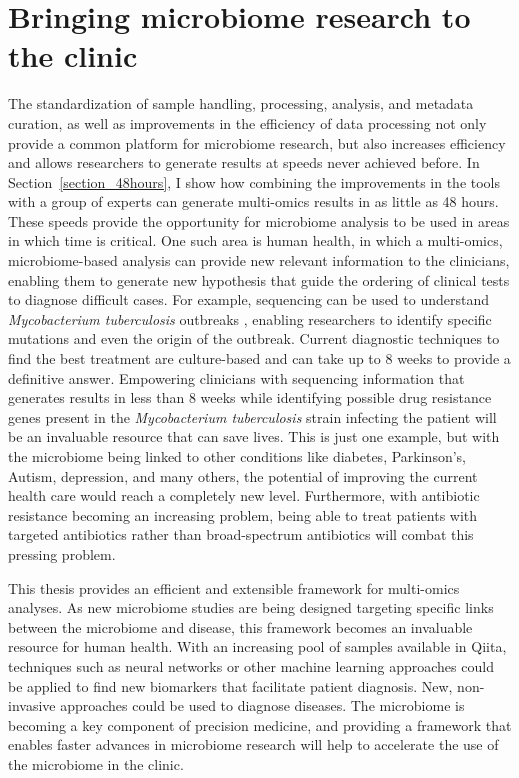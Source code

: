 \section{Bringing microbiome research to the clinic}

The standardization of sample handling, processing, analysis, and metadata curation,
as well as improvements in the efficiency of data processing not only provide a
common platform for microbiome research, but also increases efficiency and allows
researchers to generate results at speeds never achieved before. In Section~\ref{section_48hours},
I show how combining the improvements in the tools with a group of experts can
generate multi-omics results in as little as 48 hours. These speeds provide the
opportunity for microbiome analysis to be used in areas in which time is critical.
One such area is human health, in which a multi-omics, microbiome-based analysis
can provide new relevant information to the clinicians, enabling them to generate
new hypothesis that guide the ordering of clinical tests to diagnose
difficult cases. For example, sequencing can be used to understand \emph{Mycobacterium tuberculosis}
outbreaks \cite{Guthrie2017}, enabling researchers to identify specific mutations
and even the origin of the outbreak. Current diagnostic techniques to find the
best treatment are culture-based and can take up to 8 weeks to provide a definitive
answer. Empowering clinicians with sequencing information that generates results in
less than 8 weeks while identifying possible drug resistance genes present in the
\emph{Mycobacterium tuberculosis} strain infecting the patient will be an invaluable
resource that can save lives. This is just one example, but with the microbiome
being linked to other conditions like diabetes, Parkinson's, Autism, depression,
and many others, the potential of improving the current health care would reach a completely
new level. Furthermore, with antibiotic resistance becoming an increasing problem,
being able to treat patients with targeted antibiotics rather than broad-spectrum antibiotics
will combat this pressing problem.

This thesis provides an efficient and extensible framework for multi-omics analyses.
As new microbiome studies are being designed targeting specific links between the
microbiome and disease, this framework becomes an invaluable resource for human
health. With an increasing pool of samples available in Qiita, techniques such as
neural networks or other machine learning approaches could be applied to find new
biomarkers that facilitate patient diagnosis. New, non-invasive approaches could
be used to diagnose diseases. The microbiome is becoming a key component of precision
medicine, and providing a framework that enables faster advances in microbiome
research will help to accelerate the use of the microbiome in the clinic.
